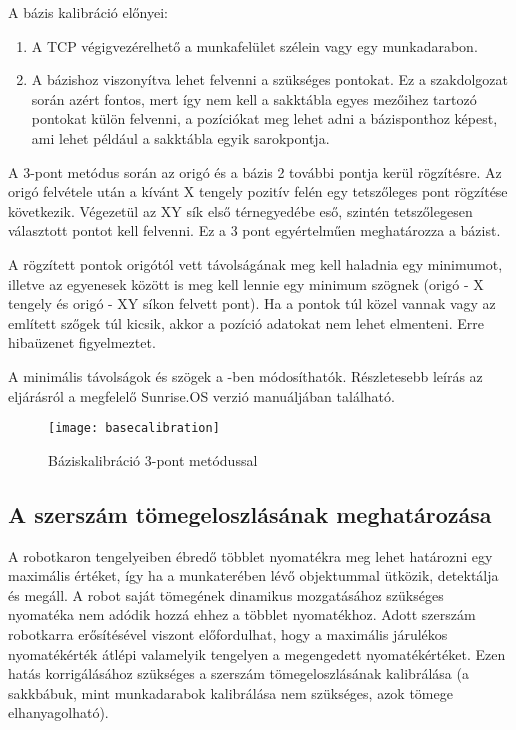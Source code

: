 \documentclass[../documentation.tex]{subfiles}
\begin{document}
A bázis kalibráció előnyei:
\begin{enumerate}
	\item A TCP végigvezérelhető a munkafelület szélein vagy egy munkadarabon.
	\item A bázishoz viszonyítva lehet felvenni a szükséges pontokat. Ez a szakdolgozat során azért fontos, mert így nem kell a sakktábla egyes mezőihez tartozó pontokat külön felvenni, a pozíciókat meg lehet adni a bázisponthoz képest, ami lehet például a sakktábla egyik sarokpontja.
\end{enumerate}

A 3-pont metódus során az origó és a bázis 2 további pontja kerül rögzítésre. Az origó felvétele után a kívánt X tengely pozitív felén egy tetszőleges pont rögzítése következik. Végezetül az XY sík első térnegyedébe eső, szintén tetszőlegesen választott pontot kell felvenni. Ez a 3 pont egyértelműen meghatározza a bázist.

A rögzített pontok origótól vett távolságának meg kell haladnia egy minimumot, illetve az egyenesek között is meg kell lennie egy minimum szögnek (origó - X tengely és origó - XY síkon felvett pont). Ha a pontok túl közel vannak vagy az említett szőgek túl kicsik, akkor a pozíció adatokat nem lehet elmenteni. Erre hibaüzenet figyelmeztet.

A minimális távolságok és szögek a -ben módosíthatók. Részletesebb leírás az eljárásról a megfelelő Sunrise.OS verzió manuáljában található\cite{sunrisemanual}.

\begin{figure}[h]
	\centering
	\texttt{[image: basecalibration]}
	\caption{Báziskalibráció 3-pont metódussal\cite{sunrisemanual}}
	\label{fig:basecalibration}
\end{figure}

\subsection{A szerszám tömegeloszlásának meghatározása}
A robotkaron tengelyeiben ébredő többlet nyomatékra meg lehet határozni egy maximális értéket, így ha a munkaterében lévő objektummal ütközik, detektálja és megáll. A robot saját tömegének dinamikus mozgatásához szükséges nyomatéka nem adódik hozzá ehhez a többlet nyomatékhoz. Adott szerszám robotkarra erősítésével viszont előfordulhat, hogy a maximális járulékos nyomatékérték átlépi valamelyik tengelyen a megengedett nyomatékértéket. Ezen hatás korrigálásához szükséges a szerszám tömegeloszlásának kalibrálása (a sakkbábuk, mint munkadarabok kalibrálása nem szükséges, azok tömege elhanyagolható).
\end{document}
